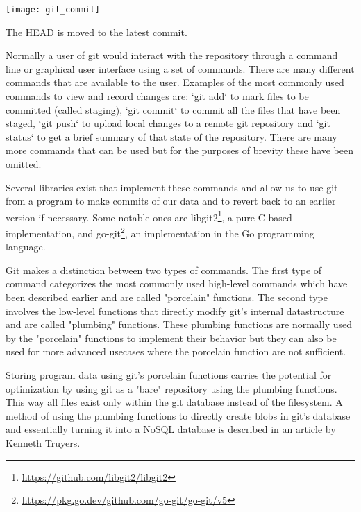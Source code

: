 \begin{marginfigure}
	\centering
	\texttt{[image: git\_commit]}
	\caption{The HEAD is moved to the latest commit.}
	\label{fig:gitcommit}
\end{marginfigure}

Normally a user of git would interact with the repository through a command line or graphical user interface using a set of commands.
There are many different commands that are available to the user.
Examples of the most commonly used commands to view and record changes are: `git add` to mark files to be committed (called staging), `git commit` to commit all the files that have been staged, `git push` to upload local changes to a remote git repository and `git status` to get a brief summary of that state of the repository. There are many more commands that can be used but for the purposes of brevity these have been omitted.

Several libraries exist that implement these commands and allow us to use git from a program to make commits of our data and to revert back to an earlier version if necessary.
Some notable ones are libgit2\footnote{\url{https://github.com/libgit2/libgit2}}, a pure C based implementation, and go-git\footnote{\url{https://pkg.go.dev/github.com/go-git/go-git/v5}}, an implementation in the Go programming language.

Git makes a distinction between two types of commands.
The first type of command categorizes the most commonly used high-level commands which have been described earlier and are called "porcelain" functions.
The second type involves the low-level functions that directly modify git's internal datastructure and are called "plumbing" functions.
These plumbing functions are normally used by the "porcelain" functions to implement their behavior but they can also be used for more advanced usecases where the porcelain function are not sufficient.

Storing program data using git's porcelain functions carries the potential for optimization by using git as a "bare" repository using the plumbing functions.
This way all files exist only within the git database instead of the filesystem.
A method of using the plumbing functions to directly create blobs in git's database and essentially turning it into a NoSQL database is described in an article by Kenneth Truyers\cite{truyers_git_2016}.

